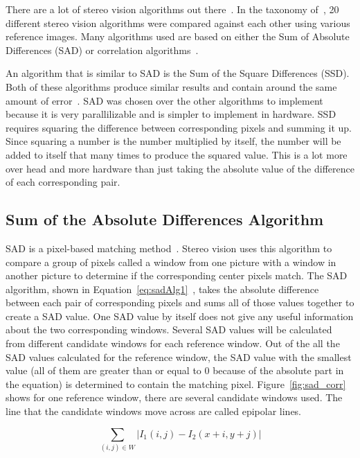 There are a lot of stereo vision algorithms out there~\cite{taxonomy}. In the taxonomy of~\cite{taxonomy}, 20 different stereo vision algorithms were compared against each other using various reference images. Many algorithms used are based on either the Sum of Absolute Differences (SAD) or correlation algorithms~\cite{alteraStratixIVPaper}.

An algorithm that is similar to SAD is the Sum of the Square Differences (SSD). Both of these algorithms produce similar results and contain around the same amount of error~\cite{xilinxSpartan3ABoard}. SAD was chosen over the other algorithms to implement because it is very parallilizable and is simpler to implement in hardware. SSD requires squaring the difference between corresponding pixels and summing it up. Since squaring a number is the number multiplied by itself, the number will be added to itself that many times to produce the squared value. This is a lot more over head and more hardware than just taking the absolute value of the difference of each corresponding pair.

\subsection{Sum of the Absolute Differences Algorithm}

SAD is a pixel-based matching method~\cite{alteraStratixIVPaper}. Stereo vision uses this algorithm to compare a group of pixels called a window from one picture with a window in another picture to determine if the corresponding center pixels match. The SAD algorithm, shown in Equation~\ref{eq:sadAlg1}~\cite{alteraStratixIVPaper}, takes the absolute difference between each pair of corresponding pixels and sums all of those values together to create a SAD value. One SAD value by itself does not give any useful information about the two corresponding windows. Several SAD values will be calculated from different candidate windows for each reference window. Out of the all the SAD values calculated for the reference window, the SAD value with the smallest value (all of them are greater than or equal to 0 because of the absolute part in the equation) is determined to contain the matching pixel. Figure~\ref{fig:sad_corr} shows for one reference window, there are several candidate windows used. The line that the candidate windows move across are called epipolar lines. 

\begin{equation}
	\sum\limits_{(i,j)\in W}\left| I_{1}(i,j)-I_{2}(x+i,y+j) \right|
	\label{eq:sadAlg1}
\end{equation}

